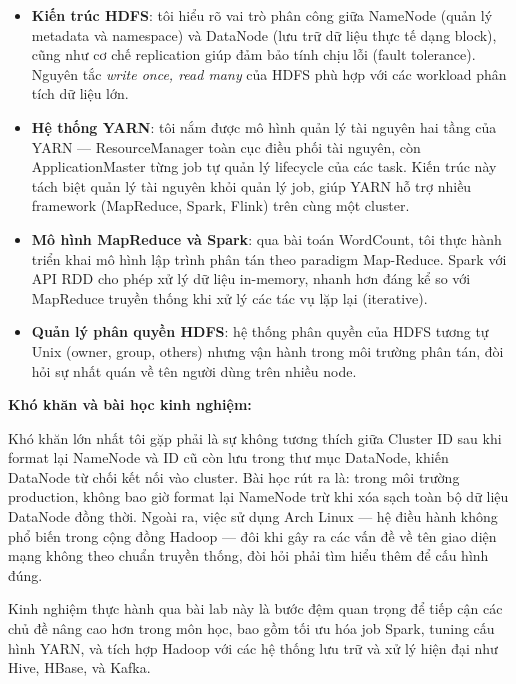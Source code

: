 \documentclass[12pt]{article}
\begin{document}
\begin{itemize}
  \item \textbf{Kiến trúc HDFS}: tôi hiểu rõ vai trò phân công giữa NameNode (quản
        lý metadata và namespace) và DataNode (lưu trữ dữ liệu thực tế dạng block),
        cũng như cơ chế replication giúp đảm bảo tính chịu lỗi (fault tolerance).
        Nguyên tắc \textit{write once, read many} của HDFS phù hợp với các workload
        phân tích dữ liệu lớn.

  \item \textbf{Hệ thống YARN}: tôi nắm được mô hình quản lý tài nguyên hai tầng
        của YARN — ResourceManager toàn cục điều phối tài nguyên, còn ApplicationMaster
        từng job tự quản lý lifecycle của các task. Kiến trúc này tách biệt quản lý
        tài nguyên khỏi quản lý job, giúp YARN hỗ trợ nhiều framework (MapReduce,
        Spark, Flink) trên cùng một cluster.

  \item \textbf{Mô hình MapReduce và Spark}: qua bài toán WordCount, tôi thực hành
        triển khai mô hình lập trình phân tán theo paradigm Map-Reduce. Spark với
        API RDD cho phép xử lý dữ liệu in-memory, nhanh hơn đáng kể so với
        MapReduce truyền thống khi xử lý các tác vụ lặp lại (iterative).

  \item \textbf{Quản lý phân quyền HDFS}: hệ thống phân quyền của HDFS tương tự
        Unix (owner, group, others) nhưng vận hành trong môi trường phân tán, đòi
        hỏi sự nhất quán về tên người dùng trên nhiều node.
\end{itemize}

\textbf{Khó khăn và bài học kinh nghiệm:}

Khó khăn lớn nhất tôi gặp phải là sự không tương thích giữa Cluster ID sau khi
format lại NameNode và ID cũ còn lưu trong thư mục DataNode, khiến DataNode từ
chối kết nối vào cluster. Bài học rút ra là: trong môi trường production, không bao
giờ format lại NameNode trừ khi xóa sạch toàn bộ dữ liệu DataNode đồng thời. Ngoài
ra, việc sử dụng Arch Linux — hệ điều hành không phổ biến trong cộng đồng Hadoop —
đôi khi gây ra các vấn đề về tên giao diện mạng không theo chuẩn truyền thống, đòi
hỏi phải tìm hiểu thêm để cấu hình đúng.

Kinh nghiệm thực hành qua bài lab này là bước đệm quan trọng để tiếp cận các chủ
đề nâng cao hơn trong môn học, bao gồm tối ưu hóa job Spark, tuning cấu hình YARN,
và tích hợp Hadoop với các hệ thống lưu trữ và xử lý hiện đại như Hive, HBase, và
Kafka.
\end{document}

